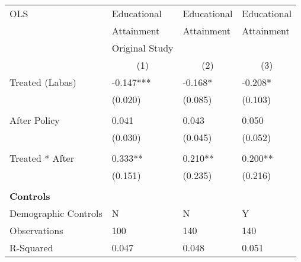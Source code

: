 \begin{tabular}{p{4cm}p{1.5cm}p{1.5cm}p{1.5cm}}
\hline\hline
OLS               &Educational & Educational &Educational \\
&Attainment &Attainment &Attainment \\
&Original Study & &  \\
&\multicolumn{1}{c}{(1)}&\multicolumn{1}{c}{(2)}&\multicolumn{1}{c}{(3)}\\
\hline
Treated (Labas)   &  -0.147***&   -0.168* & -0.208* \\
                &  (0.020)&  (0.085) & (0.103)\\
                \\
After Policy   &   0.041&   0.043 &0.050\\
                &  (0.030)&  (0.045) & (0.052)\\
                \\
Treated * After   &  0.333**&  0.210** & 0.200**\\
                &  (0.151)&  (0.235) &(0.216)\\
                \\

\multicolumn{6}{l}{\textbf{Controls}}  \\                  
Demographic Controls       &    N    &       N&        Y\\

\hline
Observations    &    100&    140 & 140\\
R-Squared    &  0.047   & 0.048 & 0.051     \\
\hline\hline
\end{tabular}